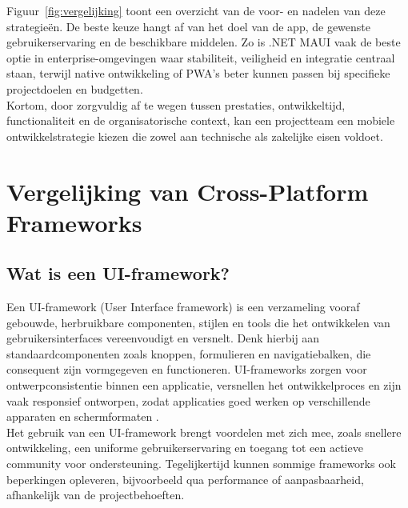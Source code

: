 Figuur~\ref{fig:vergelijking} toont een overzicht van de voor- en nadelen van deze strategieën. De beste keuze hangt af van het doel van de app, de gewenste gebruikerservaring en de beschikbare middelen. Zo is .NET MAUI vaak de beste optie in enterprise-omgevingen waar stabiliteit, veiligheid en integratie centraal staan, terwijl native ontwikkeling of PWA’s beter kunnen passen bij specifieke projectdoelen en budgetten.\\

Kortom, door zorgvuldig af te wegen tussen prestaties, ontwikkeltijd, functionaliteit en de organisatorische context, kan een projectteam een mobiele ontwikkelstrategie kiezen die zowel aan technische als zakelijke eisen voldoet.

\section{Vergelijking van Cross-Platform Frameworks}

\subsection{Wat is een UI-framework?}
Een UI-framework (User Interface framework) is een verzameling vooraf gebouwde, herbruikbare componenten, stijlen en tools die het ontwikkelen van gebruikersinterfaces vereenvoudigt en versnelt. Denk hierbij aan standaardcomponenten zoals knoppen, formulieren en navigatiebalken, die consequent zijn vormgegeven en functioneren. UI-frameworks zorgen voor ontwerpconsistentie binnen een applicatie, versnellen het ontwikkelproces en zijn vaak responsief ontworpen, zodat applicaties goed werken op verschillende apparaten en schermformaten \autocite{Coditation2023}.\\

Het gebruik van een UI-framework brengt voordelen met zich mee, zoals snellere ontwikkeling, een uniforme gebruikerservaring en toegang tot een actieve community voor ondersteuning. Tegelijkertijd kunnen sommige frameworks ook beperkingen opleveren, bijvoorbeeld qua performance of aanpasbaarheid, afhankelijk van de projectbehoeften.\\


